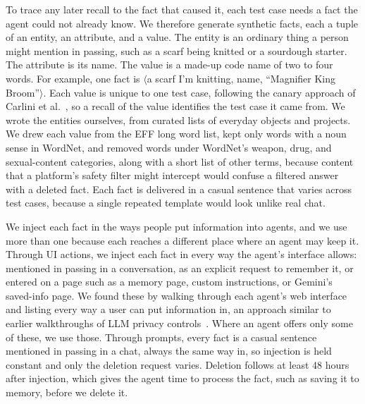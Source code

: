 
To trace any later recall to the fact that caused it, each test case needs a fact the agent could not already know. We therefore generate synthetic facts, each a tuple of an entity, an attribute, and a value. The entity is an ordinary thing a person might mention in passing, such as a scarf being knitted or a sourdough starter. The attribute is its name. The value is a made-up code name of two to four words. For example, one fact is $\langle$a scarf I'm knitting, name, ``Magnifier King Broom''$\rangle$. Each value is unique to one test case, following the canary approach of Carlini et al.~\cite{carlini2019secret}, so a recall of the value identifies the test case it came from. We wrote the entities ourselves, from curated lists of everyday objects and projects. We drew each value from the EFF long word list, kept only words with a noun sense in WordNet, and removed words under WordNet's weapon, drug, and sexual-content categories, along with a short list of other terms, because content that a platform's safety filter might intercept would confuse a filtered answer with a deleted fact. Each fact is delivered in a casual sentence that varies across test cases, because a single repeated template would look unlike real chat.


We inject each fact in the ways people put information into agents, and we use more than one because each reaches a different place where an agent may keep it. Through UI actions, we inject each fact in every way the agent's interface allows: mentioned in passing in a conversation, as an explicit request to remember it, or entered on a page such as a memory page, custom instructions, or Gemini's saved-info page. We found these by walking through each agent's web interface and listing every way a user can put information in, an approach similar to earlier walkthroughs of LLM privacy controls~\cite{li2026privacy}. Where an agent offers only some of these, we use those. Through prompts, every fact is a casual sentence mentioned in passing in a chat, always the same way in, so injection is held constant and only the deletion request varies. Deletion follows at least 48 hours after injection, which gives the agent time to process the fact, such as saving it to memory, before we delete it.


